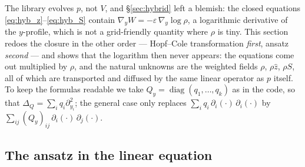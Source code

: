 \documentclass[11pt,a4paper]{article}
\newcommand{\zh}{\hat{z}}
\newcommand{\eps}{\varepsilon}
\newcommand{\gy}{\nabla_{\!y}}
\theoremstyle{plain}
\theoremstyle{definition}
\theoremstyle{remark}
\begin{document}
The library evolves $p$, not $V$, and \S\ref{sec:hybrid} left a blemish: the closed equations \eqref{eq:hyb_z}--\eqref{eq:hyb_S} contain $\gy W = -\eps\,\gy\log\rho$, a logarithmic derivative of the $y$-profile, which is not a grid-friendly quantity where $\rho$ is tiny. This section redoes the closure in the other order --- Hopf--Cole transformation \emph{first}, ansatz \emph{second} --- and shows that the logarithm then never appears: the equations come out multiplied by $\rho$, and the natural unknowns are the weighted fields $\rho$, $\rho\zh$, $\rho S$, all of which are transported and diffused by the same linear operator as $p$ itself. To keep the formulas readable we take $Q_y=\operatorname{diag}(q_1,\dots,q_k)$ as in the code, so that $\Delta_Q = \sum_i q_i\partial_{y_i}^2$; the general case only replaces $\sum_i q_i\,\partial_i(\cdot)\,\partial_i(\cdot)$ by $\sum_{ij}(Q_y)_{ij}\,\partial_i(\cdot)\,\partial_j(\cdot)$.

\subsection{The ansatz in the linear equation}
\end{document}

